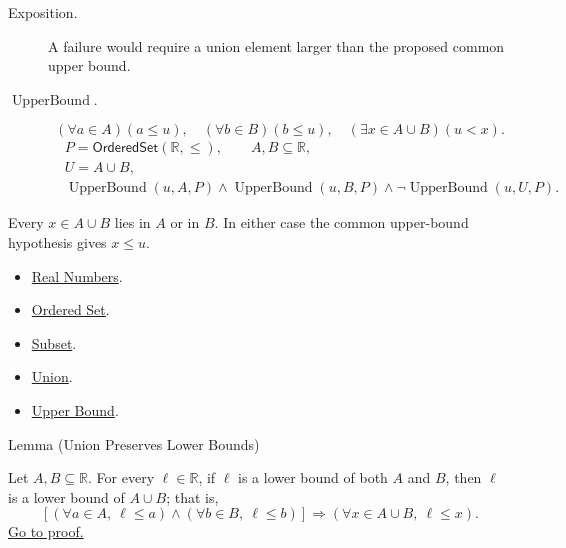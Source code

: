 \begin{remark*}
\begin{description}
\item[Exposition.]
A failure would require a union element larger than the proposed common
upper bound.


  \item[\(\operatorname{UpperBound}.\)]
  \[
(\forall a\in A)(a\leq u),\quad
(\forall b\in B)(b\leq u),\quad
(\exists x\in A\cup B)(u<x).
\]
\[
\begin{aligned}
&P=\mathsf{OrderedSet}(\mathbb{R},\leq),\qquad A,B\subseteq\mathbb{R},\\
&U=A\cup B,\\
&\operatorname{UpperBound}(u,A,P)\land\operatorname{UpperBound}(u,B,P)\land
\neg\operatorname{UpperBound}(u,U,P).
\end{aligned}
\]
\end{description}
\end{remark*}

\begin{remark*}[Interpretation]
Every $x\in A\cup B$ lies in $A$ or in $B$.  In either case the common
upper-bound hypothesis gives $x\leq u$.
\end{remark*}

\begin{dependencies}
\begin{itemize}
\item \hyperref[def:reals]{Real Numbers}.
\item \hyperref[def:ordered-set]{Ordered Set}.
\item \hyperref[def:subset]{Subset}.
\item \hyperref[def:union]{Union}.
\item \hyperref[def:real-upper-bound]{Upper Bound}.
\end{itemize}
\end{dependencies}

\begin{lemmabox}{Lemma (Union Preserves Lower Bounds)}
\begin{lemma}
\label{lem:union-preserves-lower-bounds}
Let $A,B\subseteq\mathbb{R}$. For every $\ell\in\mathbb{R}$, if $\ell$ is
a lower bound of both $A$ and $B$, then $\ell$ is a lower bound of
$A\cup B$; that is,
\[
\left[
(\forall a\in A,\ \ell\leq a)
\land
(\forall b\in B,\ \ell\leq b)
\right]
\Longrightarrow
(\forall x\in A\cup B,\ \ell\leq x).
\]
\hyperref[prf:union-preserves-lower-bounds]{Go to proof.}
\end{lemma}
\end{lemmabox}

